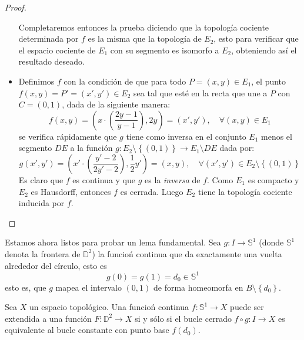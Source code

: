 \documentclass[12pt]{report}
\theoremstyle{largebreak}
\newcommand\cf[3]{\ensuremath{#1:#2\rightarrow#3}}
\begin{document}
\begin{proof}
\begin{itemize}
            Completaremos entonces la prueba diciendo que la topología cociente determinada por $f$ es la misma que la topología de $E_2$, esto para verificar que el espacio cociente de $E_1$ con su segmento es isomorfo a $E_2$, obteniendo así el resultado deseado.
            \item Definimos $f$ con la condición de que para todo $P=(x,y)\in E_1$, el punto $f(x,y)=P'=(x',y')\in E_2$ sea tal que esté en la recta que une a $P$ con $C=(0,1)$, dada de la siguiente manera:
            \begin{equation*}
                f(x,y)=\left(x\cdot\left(\frac{2y-1}{y-1}\right),2y \right)=(x',y'),\quad\forall (x,y)\in E_1
            \end{equation*}
            se verifica rápidamente que $g$ tiene como inversa en el conjunto $E_1$ menos el segmento $DE$ a la función $\cf{g}{E_2\setminus\left\{(0,1)\right\} }{E_1\setminus DE}$ dada por:
            \begin{equation*}
                g(x',y')=\left(x'\cdot\left(\frac{y'-2}{2y'-2} \right), \frac{1}{2}y'\right)=(x,y),\quad\forall (x',y')\in E_2\setminus\left\{(0,1) \right\} 
            \end{equation*}
            Es claro que $f$ es continua y que $g$ es la \textit{inversa} de $f$. Como $E_1$ es compacto y $E_2$ es Hausdorff, entonces $f$ es cerrada. Luego $E_2$ tiene la topología cociente inducida por $f$.
        \end{itemize}
    \end{proof}

    Estamos ahora listos para probar un lema fundamental. Sea $\cf{g}{I}{\mathbb{S}^1}$ (donde $\mathbb{S}^1$ denota la frontera de $\mathbb{D}^2$) la funcioń continua que da exactamente una vuelta alrededor del círculo, esto es
    \begin{equation*}
        g(0)=g(1)=d_0\in\mathbb{S}^1
    \end{equation*}
    esto es, que $g$ mapea el intervalo $(0,1)$ de forma homeomorfa en $B\setminus\left\{d_0 \right\}$.

    \begin{lema}
        Sea $X$ un espacio topológico. Una funcioń continua $\cf{f}{\mathbb{S}^1}{X}$ puede ser extendida a una función $\cf{F}{\mathbb{D}^2}{X}$ si y sólo si el bucle cerrado $\cf{f\circ g}{I}{X}$ es equivalente al bucle constante con punto base $f(d_0)$.
    \end{lema}
\end{document}
